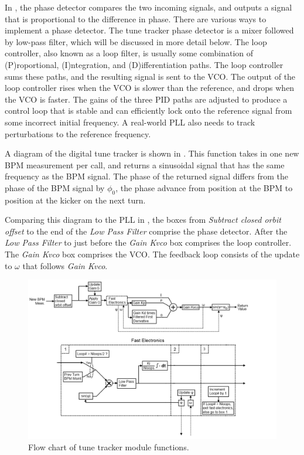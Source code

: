 In , the phase detector compares the two incoming
signals, and outputs a signal that is proportional to the difference
in phase.  There are various ways to implement a phase detector.  The
tune tracker phase detector is a mixer followed by low-pass filter,
which will be discussed in more detail below.  The loop controller,
also known as a loop filter, is usually some combination of
(P)roportional, (I)ntegration, and (D)ifferentiation paths.  The loop
controller sums these paths, and the resulting signal is sent to the
VCO.  The output of the loop controller rises when the VCO is slower
than the reference, and drops when the VCO is faster.  The gains of
the three PID paths are adjusted to produce a control loop that is
stable and can efficiently lock onto the reference signal from some
incorrect initial frequency.  A real-world PLL also needs to track
perturbations to the reference frequency.

A diagram of the digital tune tracker is shown in
.  This function takes in one new BPM measurement
per call, and returns a sinusoidal signal that has the same frequency
as the BPM signal.  The phase of the returned signal differs from the
phase of the BPM signal by $\phi_0$, the phase advance from position
at the BPM to position at the kicker on the next turn.

Comparing this diagram to the PLL in , the boxes
from {\it Subtract closed orbit offset} to the end of the {\it Low
Pass Filter} comprise the phase detector.  After the {\it Low Pass
Filter} to just before the {\it Gain Kvco} box comprises the loop
controller.  The {\it Gain Kvco} box comprises the VCO.  The feedback
loop consists of the update to $\omega$ that follows {\it Gain Kvco}.

\begin{figure}
\includegraphics[width=\columnwidth]{TT-Flow.png}
\caption{
Flow chart of tune tracker module functions.}
\label{f:CdTT}
\end{figure}

